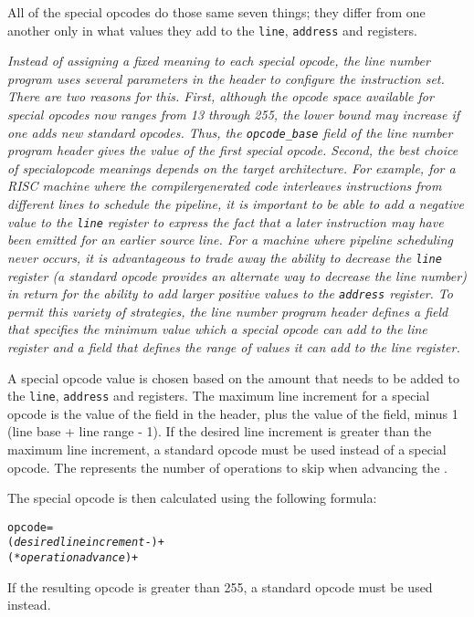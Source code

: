 All of the special opcodes do those same seven things; they
differ from one another only in what values they add to the
\texttt{line}, \texttt{address} and  registers.


\textit{Instead of assigning a fixed meaning to each special opcode,
the line number program uses several parameters in the header
to configure the instruction set. There are two reasons
for this.  First, although the opcode space available for
special opcodes now ranges from 13 through 255, the lower
bound may increase if one adds new standard opcodes. Thus, the
\texttt{opcode\_base} field of the line number program header gives the
value of the first special opcode. Second, the best choice of
special\dash opcode meanings depends on the target architecture. For
example, for a RISC machine where the compiler\dash generated code
interleaves instructions from different lines to schedule
the pipeline, it is important to be able to add a negative
value to the \texttt{line} register to express the fact that a later
instruction may have been emitted for an earlier source
line. For a machine where pipeline scheduling never occurs,
it is advantageous to trade away the ability to decrease
the \texttt{line} register (a standard opcode provides an alternate
way to decrease the line number) in return for the ability
to add larger positive values to the \texttt{address} register. To
permit this variety of strategies, the line number program
header defines a 
field that specifies the minimum
value which a special opcode can add to the line register
and a 
field that defines the range of values it
can add to the line register.}


A special opcode value is chosen based on the amount that needs
to be added to the \texttt{line}, \texttt{address} and  registers.
The maximum line increment for a special opcode is the value
of the 
field in the header, plus the value of the 
 field, minus 1 (line base + 
line range - 1). 
If the desired line increment is greater than the maximum
line increment, a standard opcode must be used instead of a
special opcode. The  represents the number
of operations to skip when advancing the .

The special opcode is then calculated using the following formula:
\begin{alltt}
  opcode = 
    (\textit{desired line increment} - ) +
      ( * \textit{operation advance}) + 
\end{alltt}
If the resulting opcode is greater than 255, a standard opcode
must be used instead.

